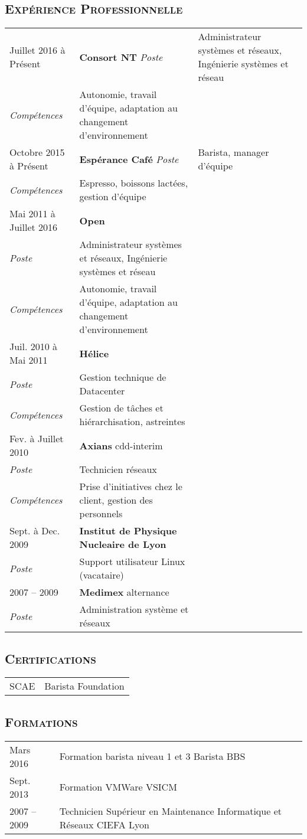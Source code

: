 \documentclass[a4paper]{article}
\newcommand{\hsubsection}[1]{\subsection*{\fontfamily{phv}\selectfont\textsc{#1}}}
\begin{document}
\hsubsection{Expérience Professionnelle}
\begin{tabular}{P{3.5cm}|p{13cm}}
Juillet 2016 à Présent & \textbf{Consort NT}
\textsl{Poste}		& Administrateur systèmes et réseaux, Ingénierie systèmes et réseau\\
\textsl{Compétences}		& Autonomie, travail d’équipe, adaptation au changement d’environnement\\
Octobre 2015 à Présent	& \textbf{Espérance Café}
\textsl{Poste} & Barista, manager d'équipe\\
\textsl{Compétences}	& Espresso, boissons lactées, gestion d'équipe\\
Mai 2011 à Juillet 2016	& \textbf{Open}\\
\textsl{Poste}		& Administrateur systèmes et réseaux, Ingénierie systèmes et réseau\\
\textsl{Compétences}		& Autonomie, travail d’équipe, adaptation au changement d’environnement\\
Juil. 2010 à Mai 2011 	& \textbf{Hélice}\\
\textsl{Poste} 		& Gestion technique de Datacenter\\
\textsl{Compétences}	& Gestion de tâches et hiérarchisation, astreintes\\
Fev. à Juillet 2010 	& \textbf{Axians} cdd-interim\\
\textsl{Poste} 		& Technicien réseaux\\
\textsl{Compétences}	& Prise d’initiatives chez le client, gestion des personnels\\
Sept. à Dec. 2009 	& \textbf{Institut de Physique Nucleaire de Lyon}\\
\textsl{Poste} 		& Support utilisateur Linux (vacataire)\\
2007 – 2009 		& \textbf{Medimex} alternance\\
\textsl{Poste} 		& Administration système et réseaux\\
\end{tabular}

\hsubsection{Certifications}
\begin{tabular}{P{3.5cm}|p{13cm}}
SCAE			& Barista Foundation\\
\end{tabular}

\hsubsection{Formations}
\begin{tabular}{P{3.5cm}|p{13cm}}
Mars 2016		& Formation barista niveau 1 et 3 Barista BBS\\
Sept. 2013		& Formation VMWare VSICM\\
2007 – 2009		& Technicien Supérieur en Maintenance Informatique et Réseaux CIEFA Lyon\\
\end{tabular}
\end{document}
